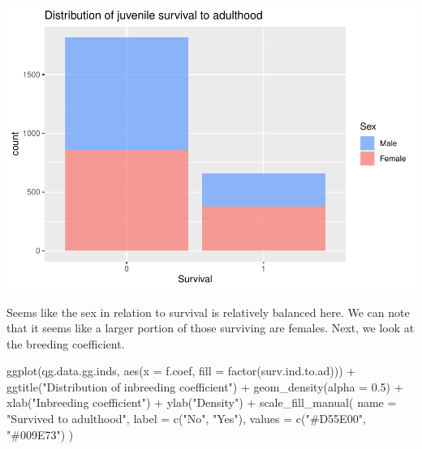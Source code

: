 \documentclass[
]{article}
\newenvironment{Shaded}{\begin{snugshade}}{\end{snugshade}}
\newcommand{\AttributeTok}[1]{\textcolor[rgb]{0.77,0.63,0.00}{#1}}
\newcommand{\FloatTok}[1]{\textcolor[rgb]{0.00,0.00,0.81}{#1}}
\newcommand{\FunctionTok}[1]{\textcolor[rgb]{0.00,0.00,0.00}{#1}}
\newcommand{\NormalTok}[1]{#1}
\newcommand{\SpecialCharTok}[1]{\textcolor[rgb]{0.00,0.00,0.00}{#1}}
\newcommand{\StringTok}[1]{\textcolor[rgb]{0.31,0.60,0.02}{#1}}
\begin{document}
\includegraphics{EDA_files/figure-latex/unnamed-chunk-7-1.pdf}

Seems like the sex in relation to survival is relatively balanced here.
We can note that it seems like a larger portion of those surviving are
females. Next, we look at the breeding coefficient.

\begin{Shaded}
\begin{Highlighting}[]
\FunctionTok{ggplot}\NormalTok{(qg.data.gg.inds, }\FunctionTok{aes}\NormalTok{(}\AttributeTok{x =}\NormalTok{ f.coef,}
                            \AttributeTok{fill =} \FunctionTok{factor}\NormalTok{(surv.ind.to.ad))) }\SpecialCharTok{+}
  \FunctionTok{ggtitle}\NormalTok{(}\StringTok{"Distribution of inbreeding coefficient"}\NormalTok{) }\SpecialCharTok{+}
  \FunctionTok{geom\_density}\NormalTok{(}\AttributeTok{alpha =} \FloatTok{0.5}\NormalTok{) }\SpecialCharTok{+}
  \FunctionTok{xlab}\NormalTok{(}\StringTok{"Inbreeding coefficient"}\NormalTok{) }\SpecialCharTok{+}
  \FunctionTok{ylab}\NormalTok{(}\StringTok{"Density"}\NormalTok{) }\SpecialCharTok{+}
  \FunctionTok{scale\_fill\_manual}\NormalTok{(}
    \AttributeTok{name =} \StringTok{"Survived to adulthood"}\NormalTok{,}
    \AttributeTok{label =} \FunctionTok{c}\NormalTok{(}\StringTok{"No"}\NormalTok{, }\StringTok{"Yes"}\NormalTok{),}
    \AttributeTok{values =} \FunctionTok{c}\NormalTok{(}\StringTok{"\#D55E00"}\NormalTok{, }\StringTok{"\#009E73"}\NormalTok{)}
\NormalTok{  )}
\end{Highlighting}
\end{Shaded}
\end{document}
